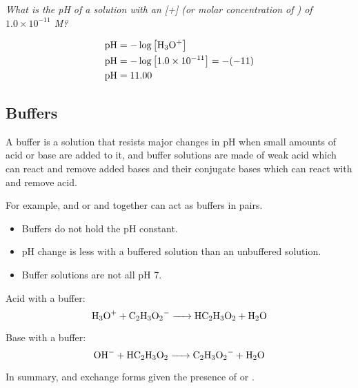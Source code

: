 \begin{example}
\textit{What is the pH of a solution with an [+] (or molar concentration of ) of $1.0 \times 10^{-11}$ M?}

\begin{align}
\mathrm{pH} &= -\log\left[\ce{H3O+}\right] \\
\mathrm{pH} &= -\log\left[1.0 \times 10^{-11}\right] = -(-11) \\
\mathrm{pH} &= 11.00
\end{align}
\end{example}

\subsection{Buffers}

\begin{defn}
A buffer is a solution that resists major changes in pH when small amounts of acid or base are added to it, and buffer solutions are made of weak acid which can react and remove added bases and their conjugate bases which can react with and remove acid.
\end{defn}

\begin{example}
For example,  and  or  and  together can act as buffers in pairs.
\end{example}

\begin{itemize}
\item Buffers do not hold the pH constant.
\item pH change is less with a buffered solution than an unbuffered solution.
\item Buffer solutions are not all pH 7.
\end{itemize}

\begin{example}
Acid with a buffer:
\begin{equation}
\ce{H3O+ + C2H3O2- -> HC2H3O2 + H2O}
\end{equation}

\noindent
Base with a buffer:
\begin{equation}
\ce{OH- + HC2H3O2 -> C2H3O2- + H2O}
\end{equation}

\noindent
In summary,  and  exchange forms given the presence of  or .
\end{example}

